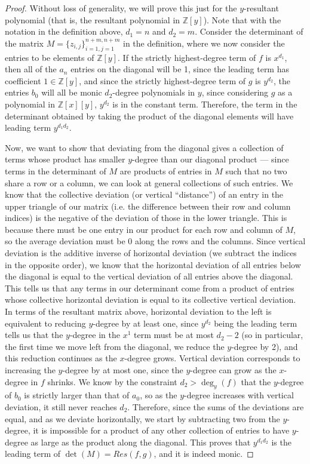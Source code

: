 \documentclass[11pt]{report}
\newcommand{\Zx}{\mathbb{Z}[x]}
\newcommand{\Zy}{\mathbb{Z}[y]}
\begin{document}
\begin{proof}
Without loss of generality, we will prove this just for the $y$-resultant polynomial (that is, the resultant polynomial in $\Zy$). Note that with the notation in the definition above, $d_1 = n$ and $d_2=m$. Consider the determinant of the matrix $M=\{z_{i,j}\}_{i=1,j=1}^{n+m,n+m}$ in the definition, where we now consider the entries to be elements of $\Zy$. If the strictly highest-degree term of $f$ is $x^{d_1}$, then all of the $a_n$ entries on the diagonal will be 1, since the leading term has coefficient $1\in \Zy$, and since the strictly highest-degree term of $g$ is $y^{d_2}$, the entries $b_0$ will all be monic $d_2$-degree polynomials in $y$, since considering $g$ as a polynomial in $\Zx[y]$, $y^{d_2}$ is in the constant term. Therefore, the term in the determinant obtained by taking the product of the diagonal elements will have leading term $y^{d_1d_2}$.

Now, we want to show that deviating from the diagonal gives a collection of terms whose product has smaller $y$-degree than our diagonal product --- since terms in the determinant of $M$ are products of entries in $M$ such that no two share a row or a column, we can look at general collections of such entries. We know that the collective deviation (or vertical ``distance'') of an entry in the upper triangle of our matrix (i.e. the difference between their row and column indices) is the negative of the deviation of those in the lower triangle. This is because there must be one entry in our product for each row and column of $M$, so the average deviation must be 0 along the rows and the columns. Since vertical deviation is the additive inverse of horizontal deviation (we subtract the indices in the opposite order), we know that the horizontal deviation of all entries below the diagonal is equal to the vertical deviation of all entries above the diagonal. This tells us that any terms in our determinant come from a product of entries whose collective horizontal deviation is equal to its collective vertical deviation. In terms of the resultant matrix above, horizontal deviation to the left is equivalent to reducing $y$-degree by at least one, since $y^{d_2}$ being the leading term tells us that the $y$-degree in the $x^1$ term must be at most $d_2-2$ (so in particular, the first time we move left from the diagonal, we reduce the $y$-degree by 2), and this reduction continues as the $x$-degree grows. Vertical deviation corresponds to increasing the $y$-degree by at most one, since the $y$-degree can grow as the $x$-degree in $f$ shrinks. We know by the constraint $d_2 > \deg_y(f)$ that the $y$-degree of $b_0$ is strictly larger than that of $a_0$, so as the $y$-degree increases with vertical deviation, it still never reaches $d_2$. Therefore, since the sums of the deviations are equal, and as we deviate horizontally, we start by subtracting two from the $y$-degree, it is impossible for a product of any other collection of entries to have $y$-degree as large as the product along the diagonal. This proves that $y^{d_1d_2}$ is the leading term of $\det(M) = Res(f,g)$, and it is indeed monic.
\end{proof}
\end{document}
